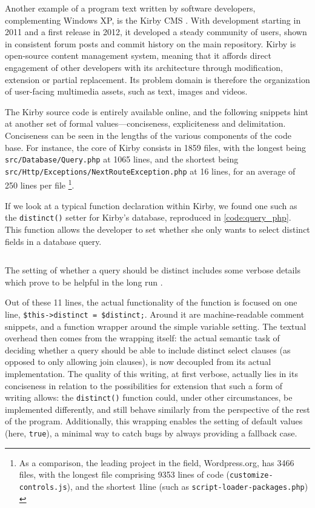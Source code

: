 Another example of a program text written by software developers, complementing Windows XP, is the Kirby CMS \citep{allgeier_kirby_2022}. With development starting in 2011 and a first release in 2012, it developed a steady community of users, shown in consistent forum posts and commit history on the main repository. Kirby is open-source content management system, meaning that it affords direct engagement of other developers with its architecture through modification, extension or partial replacement. Its problem domain is therefore the organization of user-facing multimedia assets, such as text, images and videos.

The Kirby source code is entirely available online, and the following snippets hint at another set of formal values—conciseness, expliciteness and delimitation. Conciseness can be seen in the lengths of the various components of the code base. For instance, the core of Kirby consists in 1859 files, with the longest being \lstinline{src/Database/Query.php} at 1065 lines, and the shortest being \lstinline{src/Http/Exceptions/NextRouteException.php} at 16 lines, for an average of 250 lines per file \footnote{As a comparison, the leading project in the field, Wordpress.org, has 3466 files, with the longest file comprising 9353 lines of code (\lstinline{customize-controls.js}), and the shortest 1line (such as \lstinline{script-loader-packages.php}) \citep{wordpress_wordpress_2023}}.

If we look at a typical function declaration within Kirby, we found one such as the \lstinline{distinct()} setter for Kirby's database, reproduced in \autoref{code:query_php}. This function allows the developer to set whether she only wants to select distinct fields in a database query.

\begin{listing}
  \inputminted{php}{./corpus/query.php}
  \caption{The setting of whether a query should be distinct includes some verbose details which prove to be helpful in the long run \citep{allgeier_query_2021}.}
  \label{code:query_php}
\end{listing}

Out of these 11 lines, the actual functionality of the function is focused on one line, \lstinline{$this->distinct = $distinct;}. Around it are machine-readable comment snippets, and a function wrapper around the simple variable setting. The textual overhead then comes from the wrapping itself: the actual semantic task of deciding whether a query should be able to include distinct select clauses (as opposed to only allowing join clauses), is now decoupled from its actual implementation. The quality of this writing, at first verbose, actually lies in its conciseness in relation to the possibilities for extension that such a form of writing allows: the \lstinline{distinct()} function could, under other circumstances, be implemented differently, and still behave similarly from the perspective of the rest of the program. Additionally, this wrapping enables the setting of default values (here, \lstinline{true}), a minimal way to catch bugs by always providing a fallback case.

